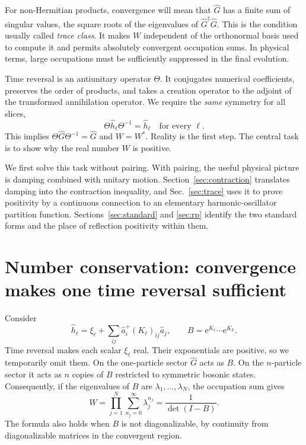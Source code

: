 \documentclass[11pt,a4paper]{article}
\newcommand{\ee}{\mathrm e}
\numberwithin{equation}{section}
\begin{document}
For non-Hermitian products, convergence will mean that $\hat G$ has a finite
sum of singular values, the square roots of the eigenvalues of
$\hat G^\dagger\hat G$. This is the condition usually called \emph{trace
class}. It makes $W$ independent of the orthonormal basis used to compute it
and permits absolutely convergent occupation sums. In physical terms, large
occupations must be sufficiently suppressed in the final evolution.

Time reversal is an antiunitary operator $\Theta$. It conjugates numerical
coefficients, preserves the order of products, and takes a creation operator
to the adjoint of the transformed annihilation operator. We require the
\emph{same} symmetry for all slices,
\begin{equation}
 \Theta\hat h_\ell\Theta^{-1}=\hat h_\ell
 \quad\text{for every }\ell.
 \label{eq:slice_trs}
\end{equation}
This implies $\Theta\hat G\Theta^{-1}=\hat G$ and $W=W^*$. Reality is the
first step. The central task is to show why the real number $W$ is positive.

We first solve this task without pairing. With pairing, the useful physical
picture is damping combined with unitary motion. Section~\ref{sec:contraction}
translates damping into the contraction inequality, and Sec.~\ref{sec:trace}
uses it to prove positivity by a continuous connection to an elementary
harmonic-oscillator partition function. Sections~\ref{sec:standard} and
\ref{sec:rp} identify the two
standard forms and the place of reflection positivity within them.

\section{Number conservation: convergence makes one time reversal sufficient}
\label{sec:number}

Consider
\begin{equation}
 \hat h_\ell=\xi_\ell+
 \sum_{ij}\hat a_i^+(K_\ell)_{ij}\hat a_j,
 \qquad B=\ee^{K_1}\cdots\ee^{K_L}.
 \label{eq:number_generator}
\end{equation}
Time reversal makes each scalar $\xi_\ell$ real. Their exponentials are
positive, so we temporarily omit them. On the one-particle sector $\hat G$
acts as $B$. On the $n$-particle sector it acts as $n$ copies of $B$ restricted
to symmetric bosonic states. Consequently, if the eigenvalues of $B$ are
$\lambda_1,\ldots,\lambda_N$, the occupation sum gives
\begin{equation}
 W=\prod_{j=1}^{N}\sum_{n_j=0}^{\infty}\lambda_j^{n_j}
   =\frac{1}{\det(I-B)}.
 \label{eq:number_trace}
\end{equation}
The formula also holds when $B$ is not diagonalizable, by continuity from
diagonalizable matrices in the convergent region.
\end{document}
